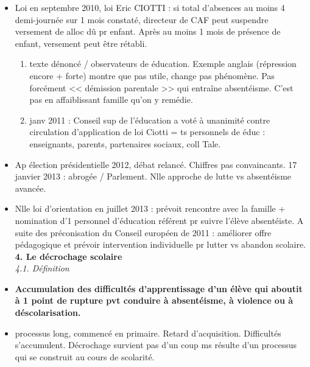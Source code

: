 \documentclass[12pt]{article}
\begin{document}
\begin{itemize}
\item Loi en septembre 2010, loi Eric CIOTTI : si total d'absences au moins 4 demi-journée sur 1 mois constaté, directeur de CAF peut suspendre versement de alloc dû pr enfant. Après au moins 1 mois de présence de enfant, versement peut être rétabli.
\begin{enumerate}
\item texte dénoncé / observateurs de éducation. Exemple anglais (répression encore + forte) montre que pas utile, change pas phénomène. Pas forcément << démission parentale >> qui entraîne absentéisme. C'est pas en affaiblissant famille qu'on y remédie.\\ 
\item janv 2011 : Conseil sup de l'éducation a voté à unanimité contre circulation d'application de loi Ciotti = ts personnels de éduc : enseignants, parents, partenaires sociaux, coll Tale. \\
\end{enumerate}

\item Ap élection présidentielle 2012, débat relancé. Chiffres pas convaincants. 17 janvier 2013 : abrogée / Parlement. Nlle approche de lutte vs absentéisme avancée.

\item Nlle loi d'orientation en juillet 2013 : prévoit rencontre avec la famille + nomination d'1 personnel d'éducation référent pr suivre l'élève absentéiste. A suite des préconisation du Conseil européen de 2011 : améliorer offre pédagogique et prévoir intervention individuelle pr lutter vs abandon scolaire. \\

\textbf{4. Le décrochage scolaire} \\

\textit{4.1. Définition} \\

\item \textbf{Accumulation des difficultés d'apprentissage d'un élève qui aboutit à 1 point de rupture pvt conduire à absentéisme, à violence ou à déscolarisation.} \\

\item processus long, commencé en primaire. Retard d'acquisition. Difficultés s'accumulent. Décrochage survient pas d'un coup ms résulte d'un processus qui se construit au cours de scolarité.\\

\end{itemize}
\end{document}
